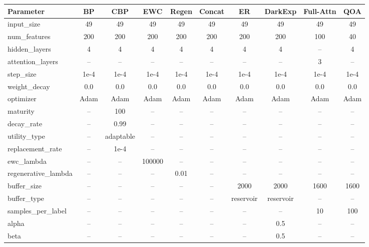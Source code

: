 \documentclass{article}
\begin{document}
\vspace{2mm}
\noindent
\begin{minipage}{\columnwidth}
\centering
\footnotesize
\setlength{\tabcolsep}{3pt}

\begin{tabular}{lccccccccc}
\toprule
\textbf{Parameter} & \textbf{BP} & \textbf{CBP} & \textbf{EWC} & \textbf{Regen} & \textbf{Concat} & \textbf{ER} & \textbf{DarkExp} & \textbf{Full-Attn} & \textbf{QOA} \\
\midrule
input\_size            & 49 & 49 & 49 & 49 & 49 & 49 & 49 & 49 & 49 \\
num\_features          & 200 & 200 & 200 & 200 & 200 & 200 & 200 & 100 & 40 \\
hidden\_layers         & 4 & 4 & 4 & 4 & 4 & 4 & 4 & -- & 4 \\
attention\_layers      & -- & -- & -- & -- & -- & -- & -- & 3 & -- \\
step\_size             & 1e-4 & 1e-4 & 1e-4 & 1e-4 & 1e-4 & 1e-4 & 1e-4 & 1e-4 & 1e-4 \\
weight\_decay          & 0.0 & 0.0 & 0.0 & 0.0 & 0.0 & 0.0 & 0.0 & 0.0 & 0.0 \\
optimizer              & Adam & Adam & Adam & Adam & Adam & Adam & Adam & Adam & Adam \\
\midrule
maturity               & -- & 100 & -- & -- & -- & -- & -- & -- & -- \\
decay\_rate            & -- & 0.99 & -- & -- & -- & -- & -- & -- & -- \\
utility\_type          & -- & adaptable & -- & -- & -- & -- & -- & -- & -- \\
replacement\_rate      & -- & 1e-4 & -- & -- & -- & -- & -- & -- & -- \\
\midrule
ewc\_lambda            & -- & -- & 100000 & -- & -- & -- & -- & -- & -- \\
regenerative\_lambda   & -- & -- & -- & 0.01 & -- & -- & -- & -- & -- \\
\midrule
buffer\_size           & -- & -- & -- & -- & -- & 2000 & 2000 & 1600 & 1600 \\
buffer\_type           & -- & -- & -- & -- & -- & reservoir & reservoir & -- & -- \\
samples\_per\_label    & -- & -- & -- & -- & -- & -- & -- & 10 & 100 \\
\midrule
alpha                  & -- & -- & -- & -- & -- & -- & 0.5 & -- & -- \\
beta                   & -- & -- & -- & -- & -- & -- & 0.5 & -- & -- \\
\bottomrule
\end{tabular}

\label{tab:pmnist_model_specs}

\end{minipage}
\end{document}
